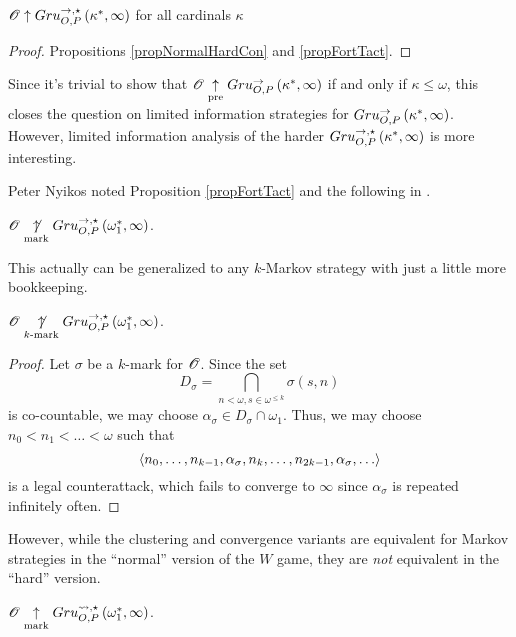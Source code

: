 \begin{cor}
  $\mathscr{O} \uparrow Gru_{O,P}^{\to,\star}\left({\kappa^*},{\infty}\right)$ for all cardinals $\kappa$
\end{cor}

\begin{proof}
  Propositions \ref{propNormalHardCon} and \ref{propFortTact}.
\end{proof}

Since it's trivial to show that
$\mathscr{O}\underset{\text{pre}}{\uparrow}Gru_{O,P}^{\to}\left({\kappa^*},{\infty}\right)$ if and
only if $\kappa\leq\omega$, this closes the question on limited information
strategies for $Gru_{O,P}^{\to}\left({\kappa^*},{\infty}\right)$. However, limited
information analysis of the harder $Gru_{O,P}^{\to,\star}\left({\kappa^*},{\infty}\right)$
is more interesting.

Peter Nyikos noted Proposition \ref{propFortTact} and the following in
\cite{MR1031771}.

\begin{thm}
  $\mathscr{O} \underset{\text{mark}}{\not\uparrow} Gru_{O,P}^{\to,\star}\left({\omega^*_1},{\infty}\right)$.
\end{thm}

This actually can be generalized to any $k$-Markov strategy with just
a little more bookkeeping.

\begin{thm}
  $\mathscr{O} \underset{k\text{-mark}}{\not\uparrow} Gru_{O,P}^{\to,\star}\left({\omega^*_1},{\infty}\right)$.
\end{thm}

\begin{proof}
  Let $\sigma$ be a $k$-mark for $\mathscr{O}$. Since the set
    \[
      D_\sigma
        =
      \bigcap_{n<\omega,s\in \omega^{\leq k}}
      \sigma(s,n)
    \]
  is co-countable, we may choose $\alpha_\sigma\in D_\sigma\cap\omega_1$.
  Thus, we may choose $n_0<n_1<\dots<\omega$ such that
    \[
      \<n_0,\dots,n_{k-1},\alpha_\sigma,
        n_k,\dots,n_{2k-1},\alpha_\sigma,
        \dots\>
    \]
  is a legal counterattack, which fails to converge to $\infty$ since
  $\alpha_\sigma$ is repeated infinitely often.
\end{proof}

However, while the clustering and convergence variants are equivalent
for Markov strategies in the ``normal'' version of the $W$ game, they are
\textit{not} equivalent in the ``hard'' version.

\begin{thm}
  $\mathscr{O}\underset{\text{mark}}{\uparrow} Gru_{O,P}^{\leadsto,\star}\left({\omega^*_1},{\infty}\right)$.
\end{thm}

